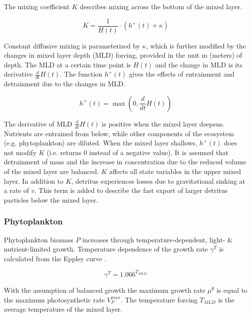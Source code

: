 \documentclass[template.tex]{subfiles}
\begin{document}
The mixing coefficient $K$ describes mixing across the bottom of the mixed layer.

\begin{equation}
    K = \frac{1}{H(t)} \cdot \left(h^{+}(t) + \kappa\right)
\end{equation}

Constant diffusive mixing is parameterized by $\kappa$, which is further modified by the changes in mixed layer depth (MLD) forcing, provided in the unit \unit{m} (meters) of depth. The MLD at a certain time point is $H(t)$ and the change in MLD is its derivative $\frac{d}{d t} H(t)$. The function $h^{+}(t)$ gives the effects of entrainment and detrainment due to the changes in MLD.

\begin{equation}
    h^{+}(t) = \max\left(0, \frac{d}{d t} H(t)\right)
\end{equation}

The derivative of MLD $\frac{d}{d t} H(t)$ is positive when the mixed layer deepens. Nutrients are entrained from below, while other components of the ecosystem (e.g. phytoplankton) are diluted. When the mixed layer shallows, $h^{+}(t)$ does not modify $K$ (i.e. returns 0 instead of a negative value). It is assumed that detrainment of mass and the increase in concentration due to the reduced volume of the mixed layer are balanced.
$K$ affects all state variables in the upper mixed layer. In addition to $K$, detritus experiences losses due to gravitational sinking at a rate of $v$. This term is added to describe the fast export of larger detritus particles below the mixed layer. 

\subsubsection{Phytoplankton}
Phytoplankton biomass $P$ increases through temperature-dependent, light- \& nutrient-limited growth. Temperature dependence of the  growth rate $\gamma^{T}$ is calculated from the Eppley curve \citep{Eppley1972TemperatureSea}.

\begin{equation}
    \gamma^{T} = 1.066^{T_{MLD}} \label{mumax}
\end{equation}

With the assumption of balanced growth the maximum growth rate $\mu^{\emptyset}$ is equal to the maximum photosynthetic rate $V^{max}_P$. The temperature forcing $T_{MLD}$ is the average temperature of the mixed layer.
\end{document}
